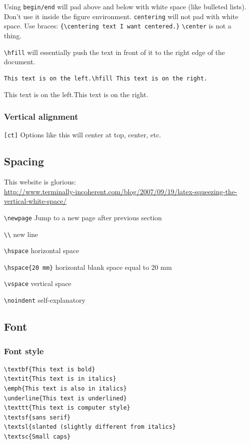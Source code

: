 \documentclass{article}
\begin{document}
Using \verb|begin/end| will pad above and
below with white space (like bulleted lists). Don't use it inside the figure
environment. \verb|centering| will not pad with white space.
Use braces: \verb|{\centering text I want centered.}|
\verb|\center| is not a thing.

\verb|\hfill| will essentially push the text in front of it to the right
edge of the document.
\begin{verbatim}
This text is on the left.\hfill This text is on the right.
\end{verbatim}
This text is on the left.\hfill This text is on the right.

\subsubsection{Vertical alignment}
\verb|[ct]| Options like this will center at top, center, etc.

\subsection{Spacing}
This website is glorious:\\
\url{http://www.terminally-incoherent.com/blog/2007/09/19/latex-squeezing-the-vertical-white-space/}
\begin{itemize*}
    \item \verb|\newpage| Jump to a new page after previous section
    \item \verb|\\| new line
    \item \verb|\hspace| horizontal space
    \item \verb|\hspace{20 mm}| horizontal blank space equal to 20 mm
    \item \verb|\vspace| vertical space
    \item \verb|\noindent| self-explanatory
\end{itemize*}

\subsection{Font}
\subsubsection{Font style}
\begin{verbatim}
\textbf{This text is bold}
\textit{This text is in italics}
\emph{This text is also in italics}
\underline{This text is underlined}
\texttt{This text is computer style}
\textsf{sans serif}
\textsl{slanted (slightly different from italics}
\textsc{Small caps}
\end{verbatim}
\end{document}
